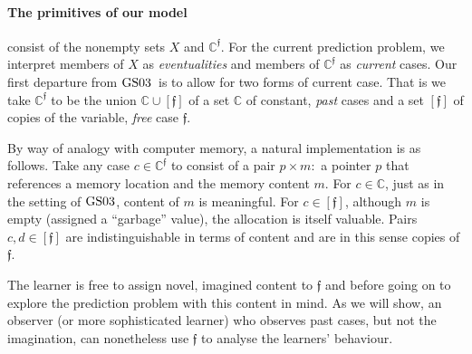 \documentclass[12pt,a4paper,twoside]{article}
\newcommand{\gsii}{$\textup{GS03}$}
\newcommand{\novel}{\mathfrak f}
\newcommand{\mbbc}{{\mathds C}}
\newcommand{\mbbcp}{{\mathds C^{\novel}}}
\newcommand{\current}{{C^\star}}
\begin{document}
\paragraph{The primitives of our model}\hskip-5pt consist of the nonempty sets
$X$ and $\mbbcp$.  For the current prediction problem, we interpret members of
$X$ as \emph{eventualities} and members of $\mbbcp$ as \emph{current} cases.
Our first departure from \gsii\ is to allow for two forms of current case.
That is we take $\mbbcp $ to be the union $\mbbc \cup [\novel]$ of a set
$\mbbc$ of constant, \emph{past} cases and a set $[\novel]$ of copies of the
variable, \emph{free} case $\novel$.
\begin{remark*}
  By way of analogy with computer memory, a natural implementation is as
  follows.  Take any case $c \in \mbbcp$ to consist of a pair $p \times m:$ a
  pointer $p$ that references a memory location and the memory content $m$.
  For $c\in \mbbc$, just as in the setting of \gsii, content of $m$ is
  meaningful.  For $c \in [\novel]$, although $m$ is empty (assigned a
  ``garbage'' value), the allocation is itself valuable. Pairs $c, d\in
  [\novel]$ are indistinguishable in terms of content and are in this sense
  copies of $\novel$.

  The learner is free to assign novel, imagined content to $\novel$ and before
  going on to explore the prediction problem with this content in mind.  As we
  will show, an observer (or more sophisticated learner) who observes past
  cases, but not the imagination, can nonetheless use $\novel$ to analyse the
  learners' behaviour.
\end{remark*}

\end{document}
